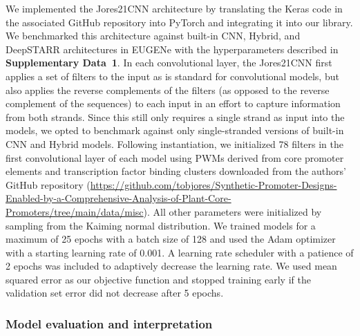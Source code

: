 We implemented the Jores21CNN architecture by translating the Keras code in the associated GitHub repository into PyTorch and integrating it into our library. We benchmarked this architecture against built-in CNN, Hybrid, and DeepSTARR architectures in EUGENe with the hyperparameters described in \textbf{\textbf{Supplementary Data~1}}. In each convolutional layer, the Jores21CNN first applies a set of filters to the input as is standard for convolutional models, but also applies the reverse complements of the filters (as opposed to the reverse complement of the sequences) to each input in an effort to capture information from both strands\cite{Onimaru2020-do}. Since this still only requires a single strand as input into the models, we opted to benchmark against only single-stranded versions of built-in CNN and Hybrid models. Following instantiation, we initialized 78 filters in the first convolutional layer of each model using PWMs derived from core promoter elements and transcription factor binding clusters downloaded from the authors’ GitHub repository (\url{https://github.com/tobjores/Synthetic-Promoter-Designs-Enabled-by-a-Comprehensive-Analysis-of-Plant-Core-Promoters/tree/main/data/misc}). All other parameters were initialized by sampling from the Kaiming normal distribution\cite{He2015-qh}. We trained models for a maximum of 25 epochs with a batch size of 128 and used the Adam optimizer with a starting learning rate of 0.001. A learning rate scheduler with a patience of 2 epochs was included to adaptively decrease the learning rate. We used mean squared error as our objective function and stopped training early if the validation set error did not decrease after 5 epochs.

\subsubsection{Model evaluation and interpretation}


